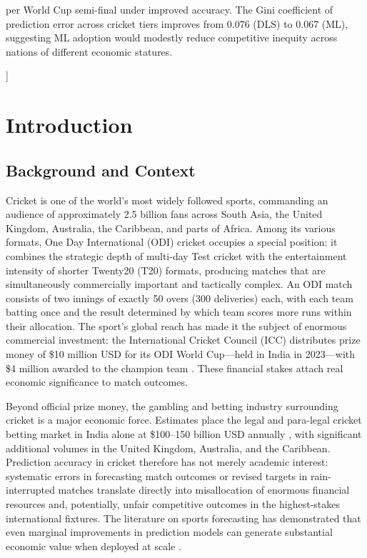 \documentclass[10pt,a4paper,twocolumn]{article}
\begin{document}
{\begin{center}
\begin{minipage}{0.88\textwidth}
per World Cup semi-final under improved accuracy. The Gini coefficient of prediction error across cricket tiers improves from 0.076 (DLS) to 0.067 (ML), suggesting ML adoption would modestly reduce competitive inequity across nations of different economic statures.
\end{minipage}
\end{center}
\vspace{1.5em}
}]

\section{Introduction}
\label{sec:intro}

\subsection{Background and Context}

Cricket is one of the world's most widely followed sports, commanding an audience of approximately 2.5 billion fans across South Asia, the United Kingdom, Australia, the Caribbean, and parts of Africa. Among its various formats, One Day International (ODI) cricket occupies a special position: it combines the strategic depth of multi-day Test cricket with the entertainment intensity of shorter Twenty20 (T20) formats, producing matches that are simultaneously commercially important and tactically complex. An ODI match consists of two innings of exactly 50 overs (300 deliveries) each, with each team batting once and the result determined by which team scores more runs within their allocation. The sport's global reach has made it the subject of enormous commercial investment: the International Cricket Council (ICC) distributes prize money of \$10 million USD for its ODI World Cup---held in India in 2023---with \$4 million awarded to the champion team \citep{ICC2023prizes}. These financial stakes attach real economic significance to match outcomes.

Beyond official prize money, the gambling and betting industry surrounding cricket is a major economic force. Estimates place the legal and para-legal cricket betting market in India alone at \$100--150 billion USD annually \citep{Howard1966}, with significant additional volumes in the United Kingdom, Australia, and the Caribbean. Prediction accuracy in cricket therefore has not merely academic interest: systematic errors in forecasting match outcomes or revised targets in rain-interrupted matches translate directly into misallocation of enormous financial resources and, potentially, unfair competitive outcomes in the highest-stakes international fixtures. The literature on sports forecasting has demonstrated that even marginal improvements in prediction models can generate substantial economic value when deployed at scale \citep{Bunker2019}.
\end{document}
